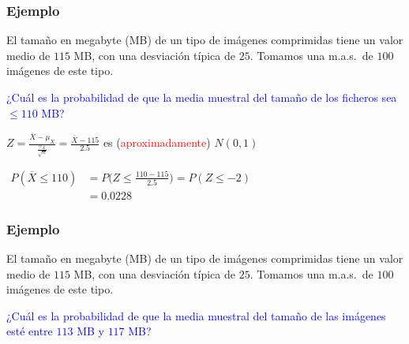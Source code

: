 \documentclass[12pt,t]{beamer}\usepackage[]{graphicx}\usepackage[]{color}
\newcommand{\red}[1]{\textcolor{red}{#1}}
\newcommand{\blue}[1]{\textcolor{blue}{#1}}
\renewcommand{\leq}{\leqslant}
\theoremstyle{plain}
\theoremstyle{definition}
\begin{document}
% 
% 
% 
% 
% 




\begin{frame}
\frametitle{Ejemplo}
\vspace*{-2ex}

El tamaño en megabyte (MB)  de un  tipo de imágenes comprimidas tiene  un  valor medio de   $115$ MB, con una desviación típica de $25$. Tomamos  una m.a.s.\ de $100$ imágenes de este tipo.
\medskip

\blue{¿Cuál es la probabilidad de que la media muestral del tamaño de los ficheros  sea $\leq 110$ MB?}
\medskip

$\displaystyle Z=\frac{\overline{X}-\mu_{X}}{\frac{\sigma_{X}}{\sqrt{n}}}=
\frac{\overline{X}-115}{2.5}$ es (\red{aproximadamente}) $N(0,1)$
\medskip

$\begin{array}{rl}
P(\overline{X}\leq 110)  &\displaystyle= P\Big(Z\leq \frac{110-115}{2.5}\Big)= P(Z\leq -2)\\[2ex]
& \displaystyle=0.0228
\end{array}$


\end{frame}



\begin{frame}
\vspace*{-2ex}

\frametitle{Ejemplo}

El tamaño en megabyte (MB)  de un  tipo de imágenes comprimidas tiene  un  valor medio de   $115$ MB, con una desviación típica de $25$. Tomamos  una m.a.s.\ de $100$ imágenes de este tipo.
\medskip

\blue{¿Cuál es la probabilidad de que la media muestral del tamaño de las imágenes esté entre $113$ MB y $117$ MB?}
\medskip


\end{frame}
\end{document}
